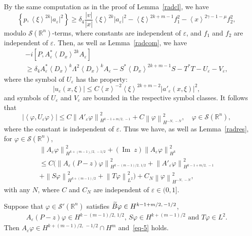 \documentclass[AHL,Unicode,longabstracts,published]{cedram}
\renewcommand*\c{\gamma}
\renewcommand*\d{\delta}
\newcommand*\e{\varepsilon}
\newcommand*\f{\varphi}
\newcommand*\m{\mu}
\newcommand*\x{\xi}
\renewcommand{\L}{\Lambda}
\newcommand*\re{\mathbb{R}}
\newcommand{\clS}{\mathcal{S}}
\DeclareMathOperator{\Iml}{Im\;}
\newcommand{\jap}[1]{\left\langle #1 \right\rangle}
\newcommand{\norm}[1]{\left\| #1 \right\|}
\newcommand{\bigpare}[1]{\bigl(#1\bigr)}
\let\oldtilde\tilde
\renewcommand*{\tilde}[1]{\mathchoice{\widetilde{#1}}{\widetilde{#1}}{\oldtilde{#1}}{\oldtilde{#1}}}
\begin{document}
By the same computation as in the proof of Lemma~\ref{radcl}, we have
\[
\left\{p,\jap{\x}^{2k}|a_\e|^2\right\} \geq \d_4 \frac{|v|}{|x|} \jap{\x}^{2k}|a_\e|^2 -\jap{\x}^{2k+m-1}f_{1}^2 -\jap{x}^{2\c-1-\m}f_{2}^2,
\]
modulo $\clS(\re^n)$-terms, where constants are independent of $\e$, and $f_1$ and $f_2$ are independent of $\e$. Then, as well as Lemma~\ref{radcom}, we have
\begin{multline*}
-i\left[P, A_\e^* \jap{D_x}^{2k} A_\e\right] \\
\geq \d_4 A_\e^* \jap{D_x}^k \L^2\jap{D_x}^k A_\e -S^*\jap{D_x}^{2k+m-1}S-T^*T-U_\e -V_\e,
\end{multline*}
where the symbol of $U_\e$ has the property:
\begin{equation}\label{eq-4}
|u_\e(x,\x)|\leq C\jap{x}^{-2}\jap{\x}^{2k+m-2}\left|a'_\e(x,\x)\right|^2,
\end{equation}
and symbols of $U_\e$ and $V_\e$ are bounded in the respective symbol classes. It follows that
\[
|\jap{\f,U_\e\f}|\leq C \norm{A'_\e\f}^2_{H^{k-1+m/2,\,-1}} +C\norm{\f}^2_{H^{-N,\,-N}}, \quad \f\in\clS(\re^n),
\]
where the constant is independent of $\e$. Thus we have, as well as Lemma~\ref{radres}, for $\f\in\clS(\re^n)$,
\begin{multline}\label{eq-5}
\norm{A_\e\f}_{H^{k+(m-1)/2,\,-1/2}}^2 +(\Iml z)\norm{A_\e\f}_{H^k}^2\\
\leq C\bigpare{\norm{A_\e(P-z)\f}_{H^{k-(m-1)/2,\,1/2}}^2 +\norm{A'_\e\f}_{H^{k-1+m/2,\,-1}}^2\\
+\norm{S\f}_{H^{k+(m-1)/2}}^2 +\norm{T\f}_{L^2}^2} +C_N \norm{\f}_{H^{-N,\,-N}}^2, 
\end{multline}
with any $N$, where $C$ and $C_N$ are independent of $\e\in(0,1]$.

\begin{lemm}
Suppose that $\f\in\clS'(\re^n)$ satisfies $\tilde B\f\in H^{k-1+m/2,\,-1/2}$,
\begin{align*}
A_\e(P-z)\f\in H^{k-(m-1)/2,\,1/2},\, S\f\in H^{k+(m-1)/2}\,\, \text{and}\,\, T\f\in L^2.
\end{align*}
Then $A_\e\f\in H^{k+(m-1)/2,\,-1/2}\cap H^m$ and~\eqref{eq-5} holds.
\end{lemm}
\end{document}
